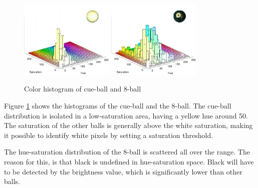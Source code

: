 \begin{figure}[H]
\centering
\subfloat
{
	\includegraphics[width=0.4\textwidth]{images/ballhist/0}
}
\subfloat
{
	\includegraphics[width=0.4\textwidth]{images/ballhist/8}
}
\caption{Color histogram of cue-ball and 8-ball}
\label{fig:ballhist-cue-8}
\end{figure}
Figure \ref{fig:ballhist-cue-8} shows the histograms of the cue-ball and the 8-ball. The cue-ball distribution is isolated in a low-saturation area, having a yellow hue around 50. The saturation of the other balls is generally above the white saturation, making it possible to identify white pixels by setting a saturation threshold.

The hue-saturation distribution of the 8-ball is scattered all over the range. The reason for this, is that black is undefined in hue-saturation space. Black will have to be detected by the brightness value, which is significantly lower than other balls. 


